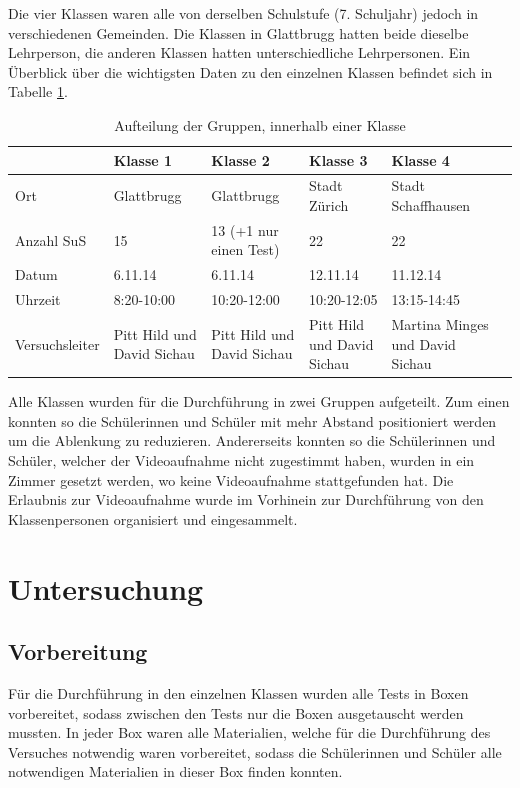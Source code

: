 Die vier Klassen waren alle von derselben Schulstufe (7. Schuljahr) jedoch in verschiedenen Gemeinden. Die Klassen in Glattbrugg hatten beide dieselbe Lehrperson, die anderen Klassen hatten unterschiedliche Lehrpersonen. Ein Überblick über die wichtigsten Daten zu den einzelnen Klassen befindet sich in Tabelle \ref{tab:Klassen}. 


\begin{table}[htbp]
  \centering
  \begin{tabular}{@{}lp{2.3cm}p{3cm}p{3cm}p{3cm}p{3cm}@{}}
  \toprule
   & Klasse 1 & Klasse 2 & Klasse 3 & Klasse 4 \\ 
  \midrule
   Ort & Glattbrugg & Glattbrugg & Stadt Zürich & Stadt Schaffhausen \\ [0.2cm]
   Anzahl SuS & 15 & 13 (+1 nur einen Test) & 22 & 22 \\ [0.2cm]
   Datum  & 6.11.14 & 6.11.14 & 12.11.14 & 11.12.14\\ [0.3cm]
   Uhrzeit & 8:20-10:00 & 10:20-12:00& 10:20-12:05 & 13:15-14:45 \\ [0.3cm]
   Versuchsleiter & Pitt Hild und David Sichau   & Pitt Hild und David Sichau  & Pitt Hild und David Sichau  & Martina Minges und David Sichau \\
  \bottomrule
  \end{tabular} 
  \caption{Aufteilung der Gruppen, innerhalb einer Klasse}
  \label{tab:Klassen}
\end{table}

Alle Klassen wurden für die Durchführung in zwei Gruppen aufgeteilt. Zum einen konnten so die Schülerinnen und Schüler mit mehr Abstand positioniert werden um die Ablenkung zu reduzieren. Andererseits konnten so die Schülerinnen und Schüler, welcher der Videoaufnahme nicht zugestimmt haben, wurden in ein Zimmer gesetzt werden, wo keine Videoaufnahme stattgefunden hat. Die Erlaubnis zur Videoaufnahme wurde im Vorhinein zur Durchführung von den Klassenpersonen organisiert und eingesammelt.



\section{Untersuchung}

\subsection{Vorbereitung}
Für die Durchführung in den einzelnen Klassen wurden alle Tests in Boxen vorbereitet, sodass zwischen den Tests nur die Boxen ausgetauscht werden mussten. In jeder Box waren alle Materialien, welche für die Durchführung des Versuches notwendig waren vorbereitet, sodass die Schülerinnen und Schüler alle notwendigen Materialien in dieser Box finden konnten.  

